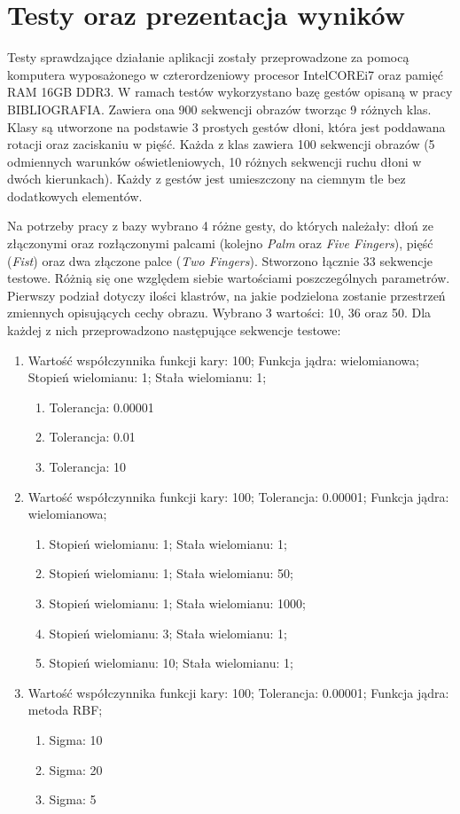 \chapter{Testy oraz prezentacja wyników}
\label{cha: Tests}
Testy sprawdzające działanie aplikacji zostały przeprowadzone za pomocą komputera wyposażonego w czterordzeniowy procesor Intel\textregistered CORE\texttrademark i7 oraz pamięć RAM 16GB DDR3. 
W ramach testów wykorzystano bazę gestów opisaną w pracy BIBLIOGRAFIA. Zawiera ona 900 sekwencji obrazów tworząc 9 różnych klas. Klasy są utworzone na podstawie 3 prostych gestów dłoni, która jest poddawana rotacji oraz zaciskaniu w pięść. Każda z klas zawiera 100 sekwencji obrazów (5 odmiennych warunków oświetleniowych, 10 różnych sekwencji ruchu dłoni w dwóch kierunkach). Każdy z gestów jest umieszczony na ciemnym tle bez dodatkowych elementów. 

Na potrzeby pracy z bazy wybrano 4 różne gesty, do których należały: dłoń ze złączonymi oraz rozłączonymi palcami (kolejno \textit{Palm} oraz \textit{Five Fingers}), pięść (\textit{Fist}) oraz dwa złączone palce (\textit{Two Fingers}).
Stworzono łącznie 33 sekwencje testowe. Różnią się one względem siebie wartościami poszczególnych parametrów. Pierwszy podział dotyczy ilości klastrów, na jakie podzielona zostanie przestrzeń zmiennych opisujących cechy obrazu. Wybrano 3 wartości: 10, 36 oraz 50. Dla każdej z nich przeprowadzono następujące sekwencje testowe: 
\begin{enumerate}
	\item Wartość współczynnika funkcji kary: 100; Funkcja jądra: wielomianowa; Stopień wielomianu: 1; Stała wielomianu: 1; 
	\begin{enumerate}
		\item \label{tol1} Tolerancja: 0.00001
		\item \label{tol2} Tolerancja: 0.01
		\item \label{tol3} Tolerancja: 10
	\end{enumerate}
	\item Wartość współczynnika funkcji kary: 100; 
	Tolerancja: 0.00001; Funkcja jądra: wielomianowa;
	\begin{enumerate}
		\item \label{pol1} Stopień wielomianu: 1; Stała wielomianu: 1;
		\item \label{pol2}Stopień wielomianu: 1; Stała wielomianu: 50;
		\item \label{pol3} Stopień wielomianu: 1; Stała wielomianu: 1000;
		\item \label{pol4} Stopień wielomianu: 3; Stała wielomianu: 1;
		\item \label{pol5} Stopień wielomianu: 10; Stała wielomianu: 1;
	\end{enumerate}
	\item Wartość współczynnika funkcji kary: 100; 
	Tolerancja: 0.00001; Funkcja jądra: metoda RBF;
	\begin{enumerate}
		\item \label{sig1} Sigma: 10
		\item \label{sig2} Sigma: 20
		\item \label{sig3} Sigma: 5
	\end{enumerate}
\end{enumerate}

